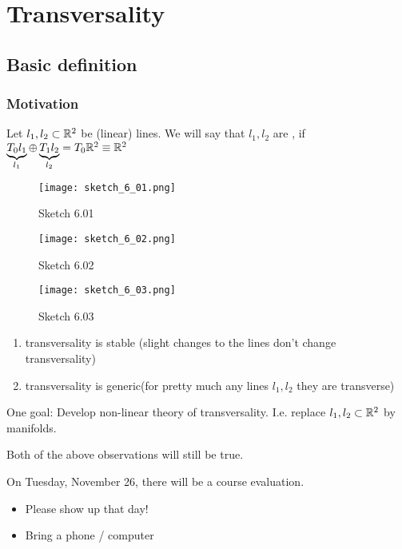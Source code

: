 \chapter{Transversality}

\section{Basic definition}

\subsection{Motivation}

Let \(l_1,l_2\subset\mathbb{R}^2\) be (linear) lines. We will say that \(l_1,l_2\) are , if 
\(\underbrace{T_0l_1}_{l_1} \oplus \underbrace{T_1l_2}_{l_2} = T_0\mathbb{R}^2\equiv \mathbb{R}^2\)
\begin{figure}[H]
    \centering
    \texttt{[image: sketch\_6\_01.png]}
    \caption{Sketch 6.01}
\end{figure}
\begin{figure}[H]
    \centering
    \texttt{[image: sketch\_6\_02.png]}
    \caption{Sketch 6.02}
\end{figure}
\begin{figure}[H]
    \centering
    \texttt{[image: sketch\_6\_03.png]}
    \caption{Sketch 6.03}
\end{figure}
\begin{enumerate}
    \item transversality is stable (slight changes to the lines don't change transversality) 
    \item transversality is generic(for pretty much any lines \(l_1,l_2\) they are transverse)
\end{enumerate}

One goal: Develop non-linear theory  of transversality. I.e. replace \(l_1,l_2\subset\mathbb{R}^2\) by manifolds.

Both of the above observations will still be true.  %



 On Tuesday, November 26, there will be a course evaluation. 

\begin{itemize}
    \item Please show up that day!
    \item Bring a phone / computer
\end{itemize}


